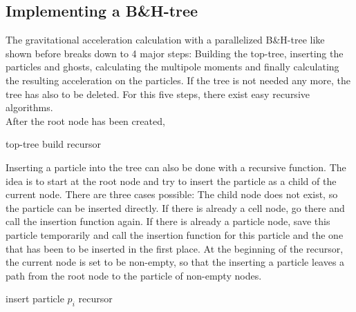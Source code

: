 \subsection{Implementing a B\&H-tree}
The gravitational acceleration calculation with a parallelized B\&H-tree like shown before breaks down to 4 major steps: Building the top-tree, inserting the particles and ghosts, calculating the multipole moments and finally calculating the resulting acceleration on the particles. If the tree is not needed any more, the tree has also to be deleted. For this five steps, there exist easy recursive algorithms.\\

After the root node has been created, 

\begin{algorithm}
\caption{top-tree build recursor}
\begin{algorithmic}
\label{alg:buildtoptree}
\ENDFOR
\ENDIF
\end{algorithmic}
\end{algorithm}

Inserting a particle into the tree can also be done with a recursive function. The idea is to start at the root node and try to insert the particle as a child of the current node. There are three cases possible: The child node does not exist, so the particle can be inserted directly. If there is already a cell node, go there and call the insertion function again. If there is already a particle node, save this particle temporarily and call the insertion function for this particle and the one that has been to be inserted in the first place. At the beginning of the recursor, the current node is set to be non-empty, so that the inserting a particle leaves a path from the root node to the particle of non-empty nodes.
\begin{algorithm}
\caption{insert particle $p_{i}$ recursor}
\begin{algorithmic}
\label{alg:insertparticle}
\ENDIF
\end{algorithmic}
\end{algorithm}\\

